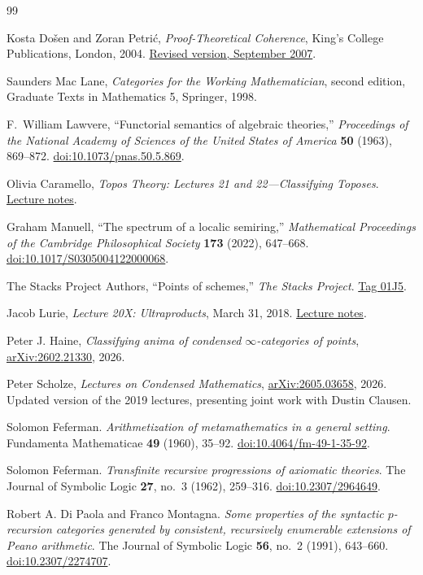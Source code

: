 \documentclass[11pt]{article}
\theoremstyle{definition}
\begin{document}
{\footnotesize
\begin{thebibliography}{99}
\setlength{\itemsep}{0pt}
\setlength{\parsep}{0pt}

Kosta Do\v{s}en and Zoran Petri\'{c},
\emph{Proof-Theoretical Coherence}, King's College Publications,
London, 2004.
\href{https://www.mi.sanu.ac.rs/novi_sajt/biography/kosta/coh.pdf}
{Revised version, September 2007}.

Saunders Mac Lane,
\emph{Categories for the Working Mathematician}, second edition,
Graduate Texts in Mathematics 5, Springer, 1998.

F.~William Lawvere,
``Functorial semantics of algebraic theories,''
\emph{Proceedings of the National Academy of Sciences of the United States of
America} \textbf{50} (1963), 869--872.
\href{https://doi.org/10.1073/pnas.50.5.869}{doi:10.1073/pnas.50.5.869}.

Olivia Caramello,
\emph{Topos Theory: Lectures 21 and 22---Classifying Toposes}.
\href{https://www.oliviacaramello.com/Teaching/CambridgeToposTheoryCourseLectures21and22.pdf}{Lecture notes}.

Graham Manuell,
``The spectrum of a localic semiring,''
\emph{Mathematical Proceedings of the Cambridge Philosophical Society}
\textbf{173} (2022), 647--668.
\href{https://doi.org/10.1017/S0305004122000068}{doi:10.1017/S0305004122000068}.

The Stacks Project Authors,
``Points of schemes,'' \emph{The Stacks Project}.
\href{https://stacks.math.columbia.edu/tag/01J5}{Tag 01J5}.

Jacob Lurie,
\emph{Lecture 20X: Ultraproducts}, March 31, 2018.
\href{https://www.math.ias.edu/~lurie/278xnotes/Lecture20X-Ultraproducts.pdf}
{Lecture notes}.

Peter J. Haine,
\emph{Classifying anima of condensed \(\infty\)-categories of points},
\href{https://arxiv.org/abs/2602.21330}{arXiv:2602.21330}, 2026.

Peter Scholze,
\emph{Lectures on Condensed Mathematics},
\href{https://arxiv.org/abs/2605.03658}{arXiv:2605.03658}, 2026.
Updated version of the 2019 lectures, presenting joint work with
Dustin Clausen.

Solomon Feferman.
\emph{Arithmetization of metamathematics in a general setting}.
Fundamenta Mathematicae \textbf{49} (1960), 35--92.
\href{https://doi.org/10.4064/fm-49-1-35-92}{doi:10.4064/fm-49-1-35-92}.

Solomon Feferman.
\emph{Transfinite recursive progressions of axiomatic theories}.
The Journal of Symbolic Logic \textbf{27}, no.~3 (1962), 259--316.
\href{https://doi.org/10.2307/2964649}{doi:10.2307/2964649}.

Robert A. Di Paola and Franco Montagna.
\emph{Some properties of the syntactic $p$-recursion categories generated
by consistent, recursively enumerable extensions of Peano arithmetic}.
The Journal of Symbolic Logic \textbf{56}, no.~2 (1991), 643--660.
\href{https://doi.org/10.2307/2274707}{doi:10.2307/2274707}.
\end{thebibliography}
}
\end{document}
